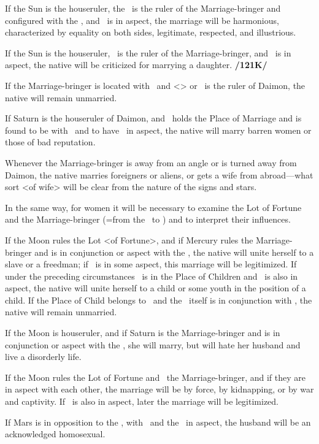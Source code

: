 If the Sun is the houseruler, the \Moon\, is the ruler of the Marriage-bringer and configured with the \Sun, and \Jupiter\, is in aspect, the marriage will be harmonious, characterized by equality on both sides, legitimate, respected, and illustrious. 

If the Sun is the houseruler, \Venus\, is the
ruler of the Marriage-bringer, and \Saturn\, is in aspect, the native will be criticized for marrying a daughter. \textbf{/121K/} 

If the Marriage-bringer is located with \Saturn\, and <\Saturn> or \Mars\, is the ruler of Daimon, the native will remain unmarried. 

If Saturn is the houseruler of Daimon, and \Venus\, holds the Place of Marriage and is found to be with \Mercury\, and to have \Mars\, in aspect, the native will marry barren women or those of bad reputation. 

Whenever the Marriage-bringer is away from an angle or is turned away from Daimon, the native marries foreigners or aliens, or gets a wife from abroad—what sort <of wife> will be clear from the nature of the signs and stars.

In the same way, for women it will be necessary to examine the Lot of Fortune and the Marriage-bringer (=from the \Moon\, to \Mars) and to interpret their influences. 

If the Moon rules the Lot <of Fortune>, and if Mercury rules the Marriage-bringer and is in conjunction or aspect with the \Moon, the native will unite herself to a slave or a freedman; if \Jupiter\, is in some aspect, this marriage will be legitimized. If under the preceding circumstances \Jupiter\, is in the Place of Children and \Saturn\, is also in aspect, the native
will unite herself to a child or some youth in the position of a child. If the Place of Child belongs to \Saturn\, and the \Moon\, itself is in conjunction with \Saturn, the native will remain unmarried. 

If the Moon is houseruler, and if Saturn is the Marriage-bringer and is in conjunction or aspect with the \Moon, she will marry, but will hate her husband and live a disorderly life. 

If the Moon rules the Lot of Fortune and \Mars\,
the Marriage-bringer, and if they are in aspect with each other, the marriage will be by force, by kidnapping, or by war and captivity. If \Jupiter\, is also in aspect, later the marriage will be legitimized. 

If Mars is in opposition to the \Moon, with \Saturn\, and the \Sun\, in aspect, the husband will be an acknowledged homosexual. 

